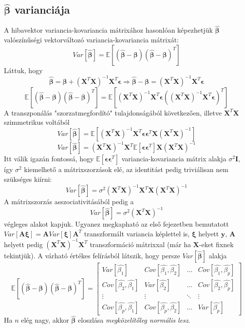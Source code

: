 \documentclass[14p]{report}
\def\pmb{\boldsymbol}
\def\ebeta{\hat{\pmb{\beta}}}
\def\e{\epsilon}
\begin{document}
	\subsection{$\ebeta$ varianciája}
	A hibavektor variancia-kovariancia mátrixához hasonlóan képezhetjük $\ebeta$ valószínűségi vektorváltozó variancia-kovariancia mátrixát:
	\[
	Var[\ebeta] = \mathbb{E}[(\ebeta - \pmb{\beta})(\ebeta - \pmb{\beta})^T]
	\]
	Láttuk, hogy
	\[
	\ebeta = \pmb{\beta} + (\pmb{X}^T\pmb{X})^{-1}\pmb{X}^T\pmb{\e} \Longrightarrow \ebeta - \pmb{\beta} = (\pmb{X}^T\pmb{X})^{-1}\pmb{X}^T\pmb{\e}
	\]
	\[
	\mathbb{E}[(\ebeta - \pmb{\beta})(\ebeta - \pmb{\beta})^T] = 
	\mathbb{E}\left[
	(\pmb{X}^T\pmb{X})^{-1}\pmb{X}^T\pmb{\e}((\pmb{X}^T\pmb{X})^{-1}\pmb{X}^T\pmb{\e})^T
	\right]
	\]
	A transzponálás "szorzatmegfordító" tulajdonságából következően, illetve $\pmb{X}^T\pmb{X}$ szimmetrikus voltából
	\[
	Var[\ebeta] = 
	\mathbb{E}\left[
	(\pmb{X}^T\pmb{X})^{-1}\pmb{X}^T\pmb{\e}\pmb{\e}^T\pmb{X}(\pmb{X}^T\pmb{X})^{-1}
	\right]
	\]
	\[
	Var[\ebeta] = (\pmb{X}^T\pmb{X})^{-1}\pmb{X}^T\mathbb{E}[\pmb{\e}\pmb{\e}^T]\pmb{X}(\pmb{X}^T\pmb{X})^{-1}
	\]
	Itt válik igazán fontossá, hogy $\mathbb{E}[\pmb{\e}\pmb{\e}^T]$ variancia-kovariancia mátrix alakja $\sigma^2\pmb{I}$, így $\sigma^2$ kiemelhető a mátrixszorzások elé, az identitást pedig triviálisan nem szükséges kiírni:
	\[
	Var[\ebeta] = \sigma^2(\pmb{X}^T\pmb{X})^{-1}\pmb{X}^T\pmb{X}(\pmb{X}^T\pmb{X})^{-1}
	\]
	A mátrixszorzás asszociativitásából pedig a
	\[
	Var[\ebeta] = \sigma^2(\pmb{X}^T\pmb{X})^{-1}
	\]
	végleges alakot kapjuk. Ugyanez megkapható az első fejezetben bemutatott $Var[\pmb{A}\pmb{\xi}] = \pmb{A}Var[\pmb{\xi}]\pmb{A}^T$ transzformált variancia képlettel is, $\pmb{\xi}$ helyett $\pmb{y}$, $\pmb{A}$ helyett pedig $(\pmb{X}^T\pmb{X})^{-1}\pmb{X}^T$ transzformáció mátrixxal (már ha $\pmb{X}$-eket fixnek tekintjük). A várható értékes felírásból látszik, hogy persze $Var[\ebeta]$ alakja
	\[
	\mathbb{E}[(\ebeta - \pmb{\beta})(\ebeta - \pmb{\beta})^T] =
	\begin{bmatrix}
		Var[\hat{\beta_1}] & Cov[\hat{\beta_1},\hat{\beta_2}] & \dots & Cov[\hat{\beta_1},\hat{\beta_p}] \\
		Cov[\hat{\beta_2},\hat{\beta_1}] & Var[\hat{\beta_2}] & \dots & Cov[\hat{\beta_2},\hat{\beta_p}] \\
		\vdots & \vdots & \ddots & \vdots \\
		Cov[\hat{\beta_p},\hat{\beta_1}] & Cov[\hat{\beta_p},\hat{\beta_2}] & \dots & Var[\hat{\beta_p}]
	\end{bmatrix}
	\]
	Ha $n$ elég nagy, akkor $\ebeta$ eloszlása \emph{megközelítőleg normális lesz}.
\end{document}
